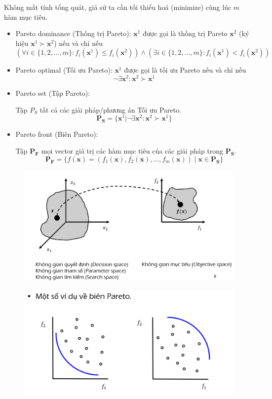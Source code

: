 \documentclass{book}
\begin{document}
Không mất tính tổng quát, giả sử ta cần tối thiểu hoá (minimize) cùng lúc $m$ hàm mục tiêu.

\begin{itemize}
    \item Pareto dominance (Thống trị Pareto):
    $\mathbf{x}^1$ được gọi là thống trị Pareto $\mathbf{x}^2$ (ký hiệu $\mathbf{x}^1 \succ \mathbf{x}^2$) nếu và chỉ nếu
    $$ (\forall i \in \{1,2,...,m\}: f_i(\mathbf{x}^1) \le f_i(\mathbf{x}^2)) \land (\exists i \in \{1,2,...,m\}: f_i(\mathbf{x}^1) < f_i(\mathbf{x}^2)) $$
    \item Pareto optimal (Tối ưu Pareto):
    $\mathbf{x}^1$ được gọi là tối ưu Pareto nếu và chỉ nếu
    $$ \neg \exists \mathbf{x}^2: \mathbf{x}^2 \succ \mathbf{x}^1 $$
\end{itemize}

\begin{itemize}
    \item Pareto set (Tập Pareto):

    Tập $P_S$ tất cả các giải pháp/phương án Tối ưu Pareto.
    \[ \mathbf{P_S} = \{ \mathbf{x}^1 | \neg \exists \mathbf{x}^2: \mathbf{x}^2 \succ \mathbf{x}^1 \} \]

    \item Pareto front (Biên Pareto):

    Tập $\mathbf{P_F}$ mọi vector giá trị các hàm mục tiêu của các giải pháp trong $\mathbf{P_S}$.
    \[ \mathbf{P_F} = \{ f(\mathbf{x}) = (f_1(\mathbf{x}), f_2(\mathbf{x}), ..., f_m(\mathbf{x})) \mid \mathbf{x} \in \mathbf{P_S} \} \]
\end{itemize}

\begin{figure}[H]
    \centering
    \includegraphics[width=0.75\linewidth]{images/GA-7-8_8.png}
\end{figure}

\begin{figure}[H]
    \centering
    \includegraphics[width=0.75\linewidth]{images/GA-7-8_9.png}
\end{figure}
\end{document}

